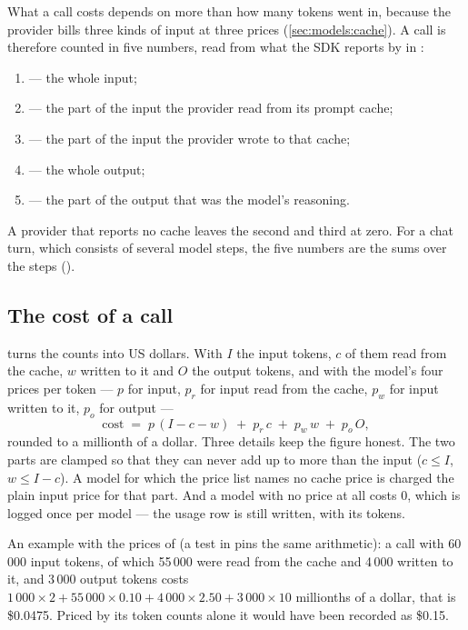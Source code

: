 What a call costs depends on more than how many tokens went in, because the provider bills
three kinds of input at three prices (\cref{sec:models:cache}). A call is therefore counted in
five numbers, read from what the SDK reports by  in :

\begin{enumerate}
  \item {} --- the whole input;
  \item {} --- the part of the input the provider read from its prompt
    cache;
  \item {} --- the part of the input the provider wrote to that cache;
  \item {} --- the whole output;
  \item {} --- the part of the output that was the model's reasoning.
\end{enumerate}

A provider that reports no cache leaves the second and third at zero. For a chat turn, which
consists of several model steps, the five numbers are the sums over the steps
().

\subsection{The cost of a call}

 turns the counts into US dollars. With $I$ the input tokens, $c$ of them read
from the cache, $w$ written to it and $O$ the output tokens, and with the model's four prices
per token --- $p$ for input, $p_r$ for input read from the cache, $p_w$ for input written to
it, $p_o$ for output ---
\[
  \mathrm{cost} \;=\; p\,(I - c - w) \;+\; p_r\,c \;+\; p_w\,w \;+\; p_o\,O ,
\]
rounded to a millionth of a dollar. Three details keep the figure honest. The two parts are
clamped so that they can never add up to more than the input ($c \le I$, $w \le I - c$). A
model for which the price list names no cache price is charged the plain input price for that
part. And a model with no price at all costs 0, which is logged once per model --- the usage
row is still written, with its tokens.

An example with the prices of  (a test in 
pins the same arithmetic): a call with 60\,000 input tokens, of which 55\,000 were
read from the cache and 4\,000 written to it, and 3\,000 output tokens costs
$1\,000 \times 2 + 55\,000 \times 0.10 + 4\,000 \times 2.50 + 3\,000 \times 10$ millionths of
a dollar, that is \$0.0475. Priced by its token counts alone it would have been recorded as
\$0.15.


